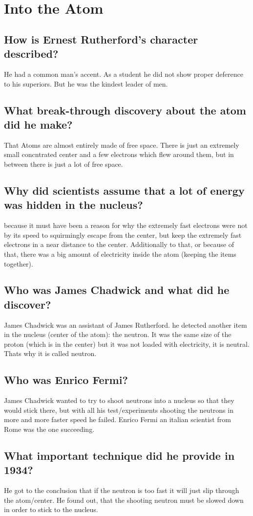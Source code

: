 %

\section{Into the Atom}

\subsection*{How is Ernest Rutherford’s character described?}
He had a common man's accent.
As a student he did not show proper deference to his superiors. But he was the kindest leader of men.

\subsection*{What break-through discovery about the atom did he make?}
That Atoms are almost entirely made of free space. There is just an extremely small concntrated center and a few electrons which flew around them, but in between there is just a lot of free space.

\subsection*{Why did scientists assume that a lot of energy was hidden in the nucleus?}
because it must have been a reason for why the extremely fast electrons were not by its speed to squirmingly escape from the center, but keep the extremely fast electrons in a near distance to the center. Additionally to that, or because of that, there was a big amount of electricity inside the atom (keeping the items together).

\subsection*{Who was James Chadwick and what did he discover?}
James Chadwick was an assistant of James Rutherford. he detected another item in the nucleus (center of the atom): the neutron. It was the same size of the proton (which is in the center) but it was not loaded with electricity, it is neutral. Thats why it is called neutron.

\subsection*{Who was Enrico Fermi?}
James Chadwick wanted to try to shoot neutrons into a nucleus so that they would stick there, but with all his test/experiments shooting the neutrons in more and more faster speed he failed. Enrico Fermi an italian scientist from Rome was the one succeeding. 

\subsection*{What important technique did he provide in 1934?}
He got to the conclusion that if the neutron is too fast it will just slip through the atom/center. He found out, that the shooting neutron must be slowed down in order to stick to the nucleus.
